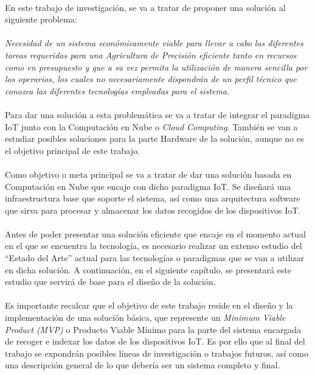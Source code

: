 \documentclass[../../memoria.tex]{subfiles}
\begin{document}
\paragraph{}
En este trabajo de investigación, se va a tratar de proponer una solución al siguiente problema:

\paragraph{}
\textit{
    Necesidad de un sistema económicamente viable para llevar a cabo las diferentes tareas requeridas para una Agricultura de Precisión eficiente tanto en recursos como en presupuesto y que a su vez permita la utilización de manera sencilla por los operarios, los cuales no necesariamente dispondrán de un perfil técnico que conozca las diferentes tecnologías empleadas para el sistema.
}

\paragraph{}
Para dar una solución a esta problemática se va a tratar de integrar el paradigma IoT junto con la Computación en Nube o \textit{Cloud Computing}. También se van a estudiar posibles soluciones para la parte Hardware de la solución, aunque no es el objetivo principal de este trabajo.

\paragraph{}
Como objetivo o meta principal se va a tratar de dar una solución basada en Computación en Nube que encaje con dicho paradigma IoT. Se diseñará una infraestructura base que soporte el sistema, así como una arquitectura software que sirva para procesar y almacenar los datos recogidos de los dispositivos IoT.

\paragraph{}
Antes de poder presentar una solución eficiente que encaje en el momento actual en el que se encuentra la tecnología, es necesario realizar un extenso estudio del “Estado del Arte” actual para las tecnologías o paradigmas que se van a utilizar en dicha solución. A continuación, en el siguiente capítulo, se presentará este estudio que servirá de base para el diseño de la solución.

\paragraph{}
Es importante recalcar que el objetivo de este trabajo reside en el diseño y la implementación de una solución básica, que represente un \textit{Minimum Viable Product (MVP)} o Producto Viable Mínimo para la parte del sistema encargada de recoger e indexar los datos de los dispositivos IoT. Es por ello que al final del trabajo se expondrán posibles líneas de investigación o trabajos futuros, así como una descripción general de lo que debería ser un sistema completo y final.
\end{document}

